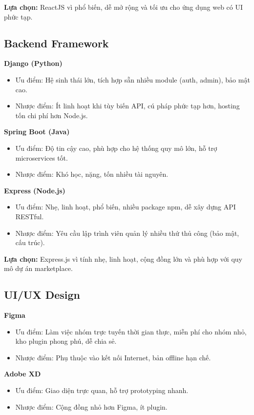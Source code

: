 \documentclass{article}
\begin{document}
\textbf{Lựa chọn:} ReactJS vì phổ biến, dễ mở rộng và tối ưu cho ứng dụng web có UI phức tạp.

\subsection{Backend Framework}

\textbf{Django (Python)}
\begin{itemize}
    \item Ưu điểm: Hệ sinh thái lớn, tích hợp sẵn nhiều module (auth, admin), bảo mật cao.
    \item Nhược điểm: Ít linh hoạt khi tùy biến API, cú pháp phức tạp hơn, hosting tốn chi phí hơn Node.js.
\end{itemize}

\textbf{Spring Boot (Java)}
\begin{itemize}
    \item Ưu điểm: Độ tin cậy cao, phù hợp cho hệ thống quy mô lớn, hỗ trợ microservices tốt.
    \item Nhược điểm: Khó học, nặng, tốn nhiều tài nguyên.
\end{itemize}

\textbf{Express (Node.js)}
\begin{itemize}
    \item Ưu điểm: Nhẹ, linh hoạt, phổ biến, nhiều package npm, dễ xây dựng API RESTful.
    \item Nhược điểm: Yêu cầu lập trình viên quản lý nhiều thứ thủ công (bảo mật, cấu trúc).
\end{itemize}

\textbf{Lựa chọn:} Express.js vì tính nhẹ, linh hoạt, cộng đồng lớn và phù hợp với quy mô dự án marketplace.

\subsection{UI/UX Design}
\textbf{Figma}
\begin{itemize}
    \item Ưu điểm: Làm việc nhóm trực tuyến thời gian thực, miễn phí cho nhóm nhỏ, kho plugin phong phú, dễ chia sẻ.
    \item Nhược điểm: Phụ thuộc vào kết nối Internet, bản offline hạn chế.
\end{itemize}

\textbf{Adobe XD}
\begin{itemize}
    \item Ưu điểm: Giao diện trực quan, hỗ trợ prototyping nhanh.
    \item Nhược điểm: Cộng đồng nhỏ hơn Figma, ít plugin.
\end{itemize}
\end{document}
